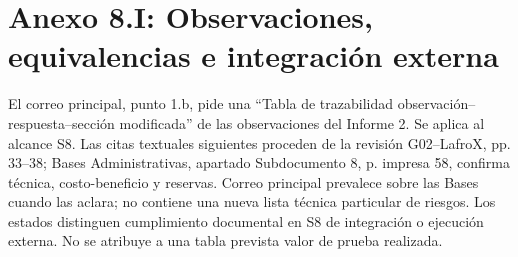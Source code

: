 \clearpage
\section{Anexo 8.I: Observaciones, equivalencias e integración externa}
\label{sec:cierre-traza}
El correo principal, punto 1.b, pide una ``Tabla de trazabilidad observación--\allowbreak respuesta--\allowbreak sección modificada'' de las observaciones del Informe 2. Se aplica al alcance S8. Las citas textuales siguientes proceden de la revisión G02--LafroX, pp. 33--38; Bases Administrativas, apartado Subdocumento 8, p. impresa 58, confirma técnica, costo-beneficio y reservas. Correo principal prevalece sobre las Bases cuando las aclara; no contiene una nueva lista técnica particular de riesgos. Los estados distinguen cumplimiento documental en S8 de integración o ejecución externa. No se atribuye a una tabla prevista valor de prueba realizada.

